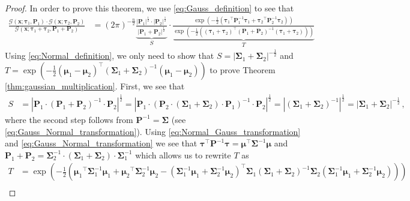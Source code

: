 \documentclass[a4paper]{article}
\newcommand{\Gauss}[3]{{\mathcal G} \left({#1};{#2},{#3}\right)}
\newcommand{\bs}[1]{{\boldsymbol{#1}}}
\newcommand{\transpose}[1]{{#1}^\top}
\theoremstyle{definition}
\begin{document}
\begin{proof}\label{prf:gaussian_multiplication_theorem}
    In order to prove this theorem, we use \eqref{eq:Gauss_definition} to see that 
    \begin{align*}
        \frac{\Gauss{\bs{x}}{\bs{\tau}_1}{\bs{P}_1} \cdot \Gauss{\bs{x}}{\bs{\tau}_2}{\bs{P}_2}}{\Gauss{\bs{x}}{\bs{\tau}_1 + \bs{\tau}_2}{\bs{P}_1 + \bs{P}_2}} & = \left(2\pi\right)^{-\frac{n}{2}} \underbrace{\frac{\left|\bs{P}_1\right|^{\frac{1}{2}} \cdot \left|\bs{P}_2\right|^{\frac{1}{2}}}{\left|\bs{P}_1 + \bs{P}_2\right|^{\frac{1}{2}}}}_S \cdot \underbrace{\frac{\exp \left( -\frac{1}{2} \left( \transpose{\bs{\tau}_1} \bs{P}^{-1}_1 \bs{\tau}_1 + \transpose{\bs{\tau}_2} \bs{P}^{-1}_2 \bs{\tau}_2 \right) \right)}{\exp \left( -\frac{1}{2} \left( \transpose{\left( \bs{\tau}_1 + \bs{\tau}_2 \right)} \left( \bs{P}_1 + \bs{P}_2 \right)^{-1} \left( \bs{\tau}_1 + \bs{\tau}_2 \right) \right) \right)}}_T
    \end{align*}
    Using \eqref{eq:Normal_definition}, we only need to show that $S =  \left|\bs{\Sigma}_1 + \bs{\Sigma}_2\right|^{-\frac{1}{2}}$ and $T = \exp \left( -\frac{1}{2} \transpose{(\bs{\mu}_1-\bs{\mu}_2)} \left( \bs{\Sigma}_1 + \bs{\Sigma}_2 \right)^{-1} (\bs{\mu}_1-\bs{\mu}_2) \right)$ to prove Theorem \ref{thm:gaussian_multiplication}. First, we see that
    \begin{align*}
        S & = \left| \bs{P}_1 \cdot \left( \bs{P}_1 + \bs{P}_2 \right)^{-1} \cdot \bs{P}_2 \right|^{\frac{1}{2}} = \left| \bs{P}_1 \cdot \left(\bs{P}_2 \cdot \left( \bs{\Sigma}_1 + \bs{\Sigma}_2 \right) \cdot \bs{P}_1 \right)^{-1} \cdot \bs{P}_2 \right|^{\frac{1}{2}} = \left|\left( \bs{\Sigma}_1 + \bs{\Sigma}_2 \right)^{-1}\right|^{\frac{1}{2}} = \left|\bs{\Sigma}_1 + \bs{\Sigma}_2\right|^{-\frac{1}{2}} \,,
    \end{align*}
    where the second step follows from $\bs{P}^{-1} = \bs{\Sigma}$ (see \eqref{eq:Gauss_Normal_transformation}). Using \eqref{eq:Normal_Gauss_transformation} and \eqref{eq:Gauss_Normal_transformation} we see that $\transpose{\bs{\tau}} \bs{P}^{-1} \bs{\tau} = \transpose{\bs{\mu}} \bs{\Sigma}^{-1} \bs{\mu}$ and $\bs{P}_1 + \bs{P}_2 = \bs{\Sigma}^{-1}_2 \cdot \left( \bs{\Sigma}_1 + \bs{\Sigma}_2 \right) \cdot \bs{\Sigma}^{-1}_1$ which allows us to rewrite $T$ as 
    \begin{align*}
        T & = \exp \left( -\frac{1}{2} \left( \transpose{\bs{\mu}_1} \bs{\Sigma}^{-1}_1 \bs{\mu}_1 + \transpose{\bs{\mu}_2} \bs{\Sigma}^{-1}_2 \bs{\mu}_2 - \transpose{\left( \bs{\Sigma}^{-1}_1 \bs{\mu}_1 + \bs{\Sigma}^{-1}_2 \bs{\mu}_2 \right)} \bs{\Sigma}_1 \left( \bs{\Sigma}_1 + \bs{\Sigma}_2 \right)^{-1} \bs{\Sigma}_2 \left( \bs{\Sigma}^{-1}_1 \bs{\mu}_1 + \bs{\Sigma}^{-1}_2 \bs{\mu}_2 \right) \right) \right) \\

\end{align*}
\end{proof}
\end{document}

